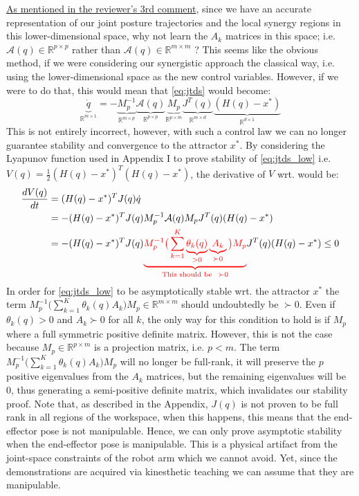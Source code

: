 \documentclass{article}
\begin{document}
\begin{enumerate}
\underline{As mentioned in the reviewer's 3rd comment}, since we have an accurate representation of our joint posture trajectories and the local synergy regions in this lower-dimensional space, why not learn the $A_k$ matrices in this space; i.e. $\mathcal{A}(q)\in \mathbb{R}^{p\times p}$ rather than $\mathcal{A}(q)\in \mathbb{R}^{m\times m}$ ? This seems like the obvious method, if we were considering our synergistic approach the classical way, i.e. using the lower-dimensional space as the new control variables. However, if we were to do that, this would mean that \eqref{eq:jtds} would become:
\begin{equation}
\underbrace{\dot{q}}_{\mathbb{R}^{m\times 1}} = -\underbrace{M_p^{-1}}_{\mathbb{R}^{m\times p}}\underbrace{\mathcal{A}(q)}_{\mathbb{R}^{p\times p}}\underbrace{M_p}_{\mathbb{R}^{p\times m}}\underbrace{J^{T}(q)}_{\mathbb{R}^{m\times d}}\underbrace{(H(q)-x^*)}_{\mathbb{R}^{d\times 1}}
\label{eq:jtds_low}
\end{equation}
This is not entirely incorrect, however, with such a control law we can no longer guarantee stability and convergence to the attractor $x^{*}$. By considering the Lyapunov function used in Appendix I to prove stability of \eqref{eq:jtds_low} i.e. $V(q) = \frac{1}{2}(H(q) - x^*)^T(H(q) - x^*)$, the derivative of $ V $ wrt. would be:
\begin{equation}
\begin{aligned}
\frac{dV(q)}{dt} &= (H(q) - x^*)^TJ(q)\dot{q}\\
&= -(H(q) - x^*)^TJ(q)M_p^{-1}\mathcal{A}(q)M_pJ^T(q)(H(q) - x^*)\\
&= -(H(q) - x^*)^TJ(q)\textcolor{red}{\underbrace{M_p^{-1}\big(\sum_{k=1}^{K}\underbrace{\theta_k(q)}_{> 0}\underbrace{A_k}_{\succ 0}\big)M_p}_{\text{This should be}~~ \succ 0}}J^T(q)(H(q) - x^*)\leq 0
\end{aligned}
\end{equation}
In order for \eqref{eq:jtds_low} to be asymptotically stable wrt. the attractor $x^*$ the term $M_p^{-1}\big(\sum_{k=1}^{K}\theta_k(q)A_k\big)M_p \in \mathbb{R}^{m\times m}$ should undoubtedly be $\succ 0$. Even if $\theta_k(q) > 0$ and $A_k \succ 0$ for all $k$, the only way for this condition to hold is if $M_p$ where a full symmetric positive definite matrix. However, this is not the case because $M_p\in \mathbb{R}^{p\times m}$  is a projection matrix, i.e. $p<m$. The term $M_p^{-1}\big(\sum_{k=1}^{K}\theta_k(q)A_k\big)M_p$ will no longer be full-rank, it will preserve the $p$ positive eigenvalues from the $A_k$ matrices, but the remaining eigenvalues will be 0, thus generating a semi-positive definite matrix, which invalidates our stability proof. Note that, as described in the Appendix, $J(q)$ is not proven to be full rank in all regions of the workspace, when this happens, this means that the end-effector pose is not manipulable. Hence, we can only prove asymptotic stability when the end-effector pose is manipulable. This is a physical artifact from the joint-space constraints of the robot arm which we cannot avoid. Yet, since the demonstrations are acquired via kinesthetic teaching we can assume that they are manipulable. \\


\end{enumerate}
\end{document}
